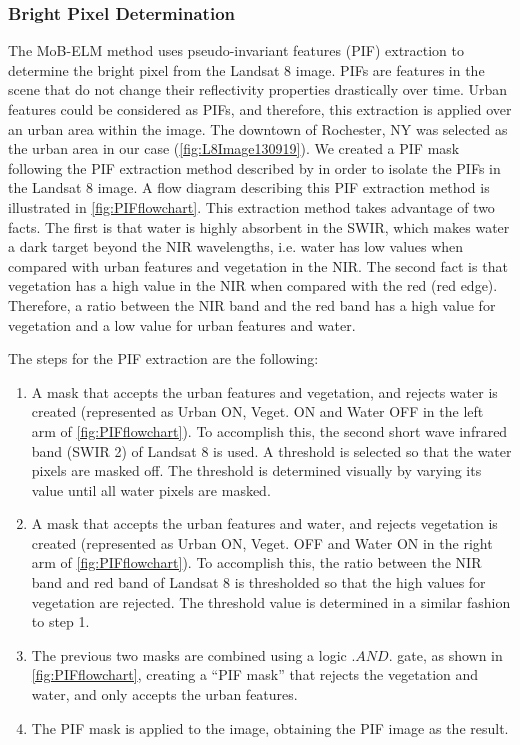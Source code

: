 \documentclass[onecolumn,3p,letterpaper,11pt]{elsarticle}
\begin{document}
\subsubsection{Bright Pixel Determination}

The MoB-ELM method uses pseudo-invariant features (PIF) extraction to determine the bright pixel from the Landsat 8 image. PIFs are features in the scene that do not change their reflectivity properties drastically over time. Urban features could be considered as PIFs, and therefore, this extraction is applied over an urban area within the image. The downtown of Rochester, NY was selected as the urban area in our case (\autoref{fig:L8Image130919}). We created a PIF mask following the PIF extraction method described by \citet{Schott:1988} in order to isolate the PIFs in the Landsat 8 image. A flow diagram describing this PIF extraction method is illustrated in \autoref{fig:PIFflowchart}. This extraction method takes advantage of two facts. The first is that water is highly absorbent in the SWIR, which makes water a dark target beyond the NIR wavelengths, i.e. water has low values when compared with urban features and vegetation in the NIR. The second fact is that vegetation has a high value in the NIR when compared with the red (red edge). Therefore, a ratio between the NIR band and the red band has a high value for vegetation and a low value for urban features and water. 

The steps for the PIF extraction are the following:
\begin{enumerate}\itemsep10pt
	\item A mask that accepts the urban features and vegetation, and rejects water is created (represented as Urban ON, Veget. ON and Water OFF in the left arm of \autoref{fig:PIFflowchart}). To accomplish this, the second short wave infrared band (SWIR 2) of Landsat 8 is used. A threshold is selected so that the water pixels are masked off. The threshold is determined visually by varying its value until all water pixels are masked. 
	\item A mask that accepts the urban features and water, and rejects vegetation is created (represented as Urban ON, Veget. OFF and Water ON in the right arm of \autoref{fig:PIFflowchart}). To accomplish this, the ratio between the NIR band and red band of Landsat 8 is thresholded so that the high values for vegetation are rejected. The threshold value is determined in a similar fashion to step 1.
	\item The previous two masks are combined using a logic $.AND.$ gate, as shown in \autoref{fig:PIFflowchart}, creating a ``PIF mask'' that rejects the vegetation and water, and only accepts the urban features.
	\item The PIF mask is applied to the image, obtaining the PIF image as the result.

\end{enumerate}
\end{document}

